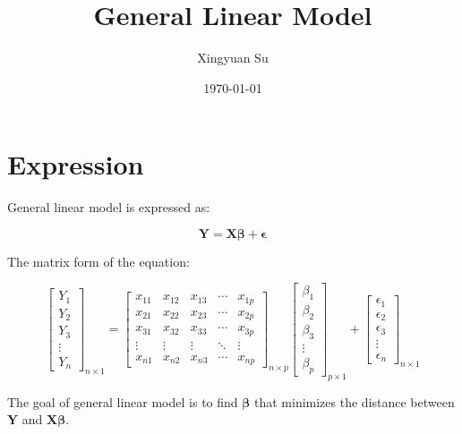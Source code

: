 \documentclass[12pt]{article}
\title{General Linear Model}
\author{Xingyuan Su}
\date{\today}
\begin{document}
\maketitle

\section{Expression}

General linear model is expressed as:

\begin{equation*}
    \boldsymbol{Y} = \boldsymbol{X}\boldsymbol{\beta} + \boldsymbol{\epsilon}
\end{equation*}

The matrix form of the equation:

\[    
\begin{bmatrix} 
    Y_1 \\ 
    Y_2 \\ 
    Y_3 \\ 
    \vdots \\
    Y_n
\end{bmatrix}_{n \times 1}
= 
\begin{bmatrix}
    x_{11} & x_{12} & x_{13} & \cdots & x_{1p} \\
    x_{21} & x_{22} & x_{23} & \cdots & x_{2p} \\
    x_{31} & x_{32} & x_{33} & \cdots & x_{3p} \\
    \vdots & \vdots & \vdots & \ddots & \vdots \\
    x_{n1} & x_{n2} & x_{n3} & \cdots & x_{np}
\end{bmatrix}_{n \times p}
\begin{bmatrix}
    \beta_1 \\
    \beta_2 \\
    \beta_3 \\
    \vdots \\
    \beta_p 
\end{bmatrix}_{p \times 1}
+ 
\begin{bmatrix}
    \epsilon_1 \\
    \epsilon_2 \\
    \epsilon_3 \\
    \vdots \\
    \epsilon_n
\end{bmatrix}_{n \times 1}
\]

The goal of general linear model is to find $\boldsymbol{\beta}$ that minimizes 
the distance between $\boldsymbol{Y}$ and $\boldsymbol{X\beta}$. 
\end{document}
